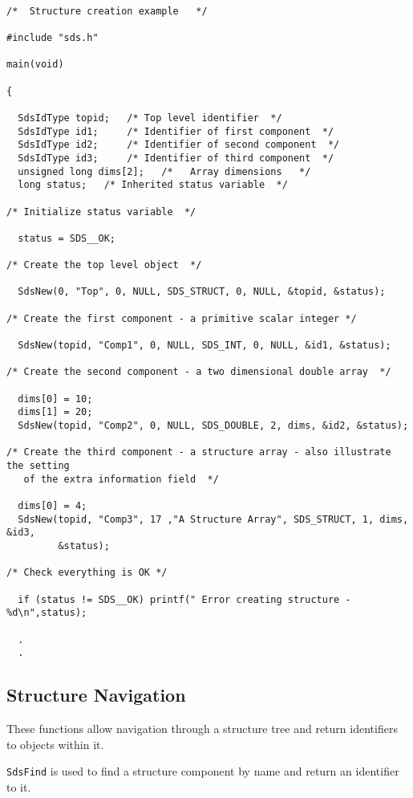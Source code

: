 \begin{verbatim}

/*  Structure creation example   */

#include "sds.h"

main(void)

{

  SdsIdType topid;   /* Top level identifier  */
  SdsIdType id1;     /* Identifier of first component  */
  SdsIdType id2;     /* Identifier of second component  */
  SdsIdType id3;     /* Identifier of third component  */
  unsigned long dims[2];   /*   Array dimensions   */
  long status;   /* Inherited status variable  */

/* Initialize status variable  */

  status = SDS__OK;
  
/* Create the top level object  */

  SdsNew(0, "Top", 0, NULL, SDS_STRUCT, 0, NULL, &topid, &status);

/* Create the first component - a primitive scalar integer */

  SdsNew(topid, "Comp1", 0, NULL, SDS_INT, 0, NULL, &id1, &status);

/* Create the second component - a two dimensional double array  */

  dims[0] = 10;
  dims[1] = 20;
  SdsNew(topid, "Comp2", 0, NULL, SDS_DOUBLE, 2, dims, &id2, &status);

/* Create the third component - a structure array - also illustrate the setting
   of the extra information field  */

  dims[0] = 4;
  SdsNew(topid, "Comp3", 17 ,"A Structure Array", SDS_STRUCT, 1, dims, &id3,
         &status);

/* Check everything is OK */

  if (status != SDS__OK) printf(" Error creating structure - %d\n",status);

  .
  .

\end{verbatim}


\subsection{Structure Navigation}

These functions allow navigation through a structure tree and return
identifiers to objects within it.

\verb$SdsFind$ is used to find a structure component by name and return an
identifier to it.

